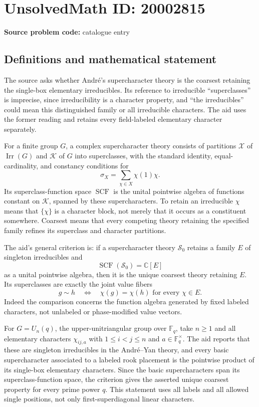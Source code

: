\documentclass[11pt]{article}
\newcommand{\C}{\mathbb{C}}
\newcommand{\F}{\mathbb{F}}
\begin{document}
\section*{UnsolvedMath ID: 20002815}
\textbf{Source problem code:} catalogue entry
\subsection{Definitions and mathematical statement}
The source asks whether Andr\'e's supercharacter theory is the coarsest retaining the single-box elementary irreducibles. Its reference to irreducible ``superclasses'' is imprecise, since irreducibility is a character property, and ``the irreducibles'' could mean this distinguished family or all irreducible characters. The aid uses the former reading and retains every field-labeled elementary character separately.

For a finite group $G$, a complex supercharacter theory consists of partitions $\mathcal X$ of $\operatorname{Irr}(G)$ and $\mathcal K$ of $G$ into superclasses, with the standard identity, equal-cardinality, and constancy conditions for
\[
 \sigma_X=\sum_{\chi\in X}\chi(1)\chi.
\]
Its superclass-function space $\operatorname{SCF}$ is the unital pointwise algebra of functions constant on $\mathcal K$, spanned by these supercharacters. To retain an irreducible $\chi$ means that $\{\chi\}$ is a character block, not merely that it occurs as a constituent somewhere. Coarsest means that every competing theory retaining the specified family refines its superclass and character partitions.

The aid's general criterion is: if a supercharacter theory $\mathcal S_0$ retains a family $E$ of singleton irreducibles and
\[
 \operatorname{SCF}(\mathcal S_0)=\C[E]
\]
as a unital pointwise algebra, then it is the unique coarsest theory retaining $E$. Its superclasses are exactly the joint value fibers
\[
 g\sim h\quad\Longleftrightarrow\quad
 \chi(g)=\chi(h)\text{ for every }\chi\in E.
\]
Indeed the comparison concerns the function algebra generated by fixed labeled characters, not unlabeled or phase-modified value vectors.

For $G=U_n(q)$, the upper-unitriangular group over $\F_q$, take $n\ge1$ and all elementary characters $\chi_{ij,a}$ with $1\le i<j\le n$ and $a\in\F_q^\times$. The aid reports that these are singleton irreducibles in the Andr\'e--Yan theory, and every basic supercharacter associated to a labeled rook placement is the pointwise product of its single-box elementary characters. Since the basic supercharacters span its superclass-function space, the criterion gives the asserted unique coarsest property for every prime power $q$. This statement uses all labels and all allowed single positions, not only first-superdiagonal linear characters.
\end{document}
